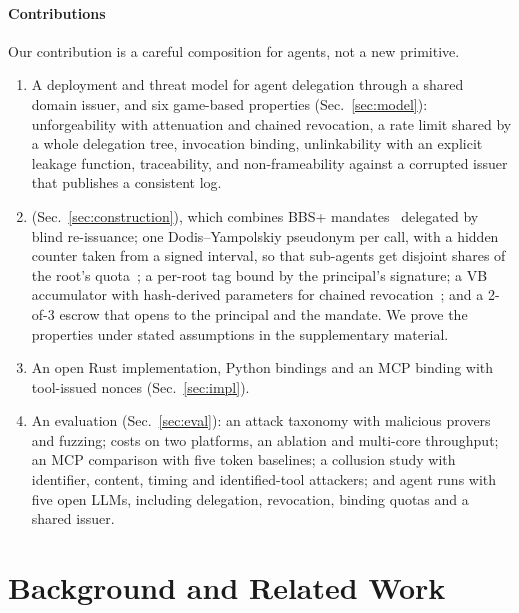 \paragraph*{Contributions} Our contribution is a careful composition for agents, not a new primitive.
\begin{enumerate}
\item A deployment and threat model for agent delegation through a shared domain issuer, and six game-based properties (Sec.~\ref{sec:model}): unforgeability with attenuation and chained revocation, a rate limit shared by a whole delegation tree, invocation binding, unlinkability with an explicit leakage function, traceability, and non-frameability against a corrupted issuer that publishes a consistent log.
\item \sys{} (Sec.~\ref{sec:construction}), which combines BBS+ mandates~\cite{au2006bbsplus,tessaro2023bbs} delegated by blind re-issuance; one Dodis--Yampolskiy pseudonym per call, with a hidden counter taken from a signed interval, so that sub-agents get disjoint shares of the root's quota~\cite{dodis2005vrf,camenisch2006clonewars}; a per-root tag bound by the principal's signature; a VB accumulator with hash-derived parameters for chained revocation~\cite{vitto2022vb}; and a 2-of-3 escrow that opens to the principal and the mandate. We prove the properties under stated assumptions in the supplementary material.
\item An open Rust implementation, Python bindings and an MCP binding with tool-issued nonces (Sec.~\ref{sec:impl}).
\item An evaluation (Sec.~\ref{sec:eval}): an attack taxonomy with malicious provers and fuzzing; costs on two platforms, an ablation and multi-core throughput; an MCP comparison with five token baselines; a collusion study with identifier, content, timing and identified-tool attackers; and agent runs with five open LLMs, including delegation, revocation, binding quotas and a shared issuer.
\end{enumerate}

\section{Background and Related Work}\label{sec:related}
